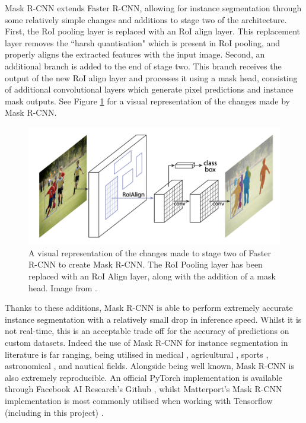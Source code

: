 Mask R-CNN extends Faster R-CNN, allowing for instance segmentation through some relatively simple changes and additions to stage two of the architecture. First, the RoI pooling layer is replaced with an RoI align layer. This replacement layer removes the ``harsh quantisation" which is present in RoI pooling, and properly aligns the extracted features with the input image. Second, an additional branch is added to the end of stage two. This branch receives the output of the new RoI align layer and processes it using a mask head, consisting of additional convolutional layers which generate pixel predictions and instance mask outputs. See Figure \ref{fig:mask-r-cnn-changes} for a visual representation of the changes made by Mask R-CNN.  

\begin{figure}
	\begin{center}
		\includegraphics[scale=0.3]{Chapter2/figs/mask-r-cnn-changes.png}
	\end{center}
	\caption{A visual representation of the changes made to stage two of Faster R-CNN to create Mask R-CNN. The RoI Pooling layer has been replaced with an RoI Align layer, along with the addition of a mask head. Image from \cite{he_mask_2017}.}
	\label{fig:mask-r-cnn-changes}
\end{figure}

Thanks to these additions, Mask R-CNN is able to perform extremely accurate instance segmentation with a relatively small drop in inference speed. Whilst it is not real-time, this is an acceptable trade off for the accuracy of predictions on custom datasets. Indeed the use of Mask R-CNN for instance segmentation in literature is far ranging, being utilised in medical \cite{rohit_malhotra_autonomous_2018, chiao_detection_2019, liu_segmentation_2018, anantharaman_utilizing_2018}, agricultural \cite{qiao_cattle_2019, zhao_comparing_2018, lee_potato_2020, chu_deepapple_2020}, sports \cite{buric_ball_2018, pobar_detection_2019, nguyen_hand_2018}, astronomical \cite{burke_deblending_2019}, and nautical \cite{nie_inshore_2018, hong_trashcan_2020} fields. Alongside being well known, Mask R-CNN is also extremely reproducible. An official PyTorch implementation is available through Facebook AI Research's Github \cite{wu_detectron2_2020}, whilst Matterport's Mask R-CNN implementation is most commonly utilised when working with Tensorflow (including in this project) \cite{waleed_mask_2017}.

